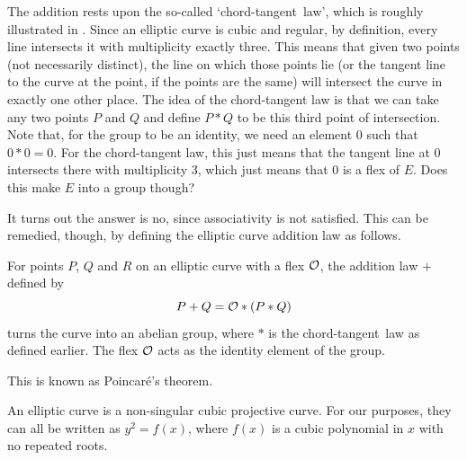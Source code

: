 The addition rests upon the so-called `chord-tangent~law', which is roughly illustrated in .
Since an elliptic curve is cubic and regular, by definition, every line intersects it with multiplicity exactly three.
This means that given two points (not necessarily distinct), the line on which those points lie (or the tangent line to the curve at the point, if the points are the same) will intersect the curve in exactly one other place.
The idea of the chord-tangent law is that we can take any two points $P$ and $Q$ and define $P * Q$ to be this third point of intersection.
Note that, for the group to be an identity, we need an element $0$ such that $0 * 0 = 0$.
For the chord-tangent law, this just means that the tangent line at $0$ intersects there with multiplicity 3, which just means that $0$ is a flex of $E$.
Does this make $E$ into a group though?

It turns out the answer is no, since associativity is not satisfied. This can be remedied, though, by defining the elliptic curve addition law as follows.
\begin{theorem}
	For points $P$, $Q$ and $R$ on an elliptic curve with a flex $\mathcal{O}$, the addition law $+$ defined by
	$$P + Q = \mathcal{O} * (P * Q)$$
	turns the curve into an abelian group, where $*$ is the chord-tangent~law as defined earlier.
	The flex $\mathcal{O}$ acts as the identity element of the group.
\end{theorem}
This is known as Poincaré's theorem.

\begin{definition}
	An elliptic curve is a non-singular cubic projective curve. For our purposes, they can all be written as $y^2 = f(x)$, where $f(x)$ is a cubic polynomial in $x$ with no repeated roots.
\end{definition}

